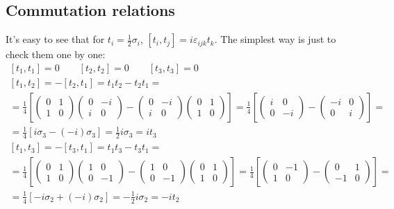 \documentclass{article}
\begin{document}
\subsection{Commutation relations}
It's easy to see that for $t_i = \frac{1}{2}\sigma_i$, $\left[t_i,t_j\right] = i\varepsilon_{ijk}t_k$. The simplest way is just to check them one by one:
\begin{equation}
\begin{gathered}
    \left[t_1,t_1\right] = 0
    \qquad
    \left[t_2,t_2\right] = 0
    \qquad
    \left[t_3,t_3\right] = 0
    \\
    \left[t_1,t_2\right] = - \left[t_2,t_1\right] = t_1t_2 - t_2t_1 = \\ = \frac{1}{4}\left[\begin{pmatrix}0&1\\1&0\end{pmatrix}\begin{pmatrix}0&-i\\i&0\end{pmatrix} - \begin{pmatrix}0&-i\\i&0\end{pmatrix}\begin{pmatrix}0&1\\1&0\end{pmatrix}\right] = \frac{1}{4}\left[\begin{pmatrix}i&0\\0&-i\end{pmatrix} - \begin{pmatrix}-i&0\\0&i\end{pmatrix}\right] = \\ = \frac{1}{4}\left[i\sigma_3 - \left(-i\right)\sigma_3\right] = \frac{1}{2}i\sigma_3 = it_3
    \\
    \left[t_1,t_3\right] = - \left[t_3,t_1\right] = t_1t_3 - t_3t_1 = \\ = \frac{1}{4}\left[\begin{pmatrix}0&1\\1&0\end{pmatrix}\begin{pmatrix}1&0\\0&-1\end{pmatrix} - \begin{pmatrix}1&0\\0&-1\end{pmatrix}\begin{pmatrix}0&1\\1&0\end{pmatrix}\right] = \frac{1}{4}\left[\begin{pmatrix}0&-1\\1&0\end{pmatrix} - \begin{pmatrix}0&1\\-1&0\end{pmatrix}\right] = \\ = \frac{1}{4}\left[-i\sigma_2 + \left(-i\right)\sigma_2\right] = -\frac{1}{2}i\sigma_2 = -it_2

\end{gathered}
\end{equation}
\end{document}
